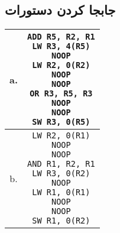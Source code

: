 \documentclass[11pt, dvipsnames, svgnames, x11names]{article}
\begin{document}
\subsection{جابجا کردن دستورات}
\begin{latin}
\begin{table}[H]
\begin{center}
\begin{tabular}{|c|c|}
\hline
a. &
\makecell[l]{
\texttt{ADD R5, R2, R1} \\
\texttt{LW R3, 4(R5)} \\
\texttt{NOOP} \\
\texttt{LW R2, 0(R2)} \\
\texttt{NOOP} \\
\texttt{NOOP} \\
\texttt{OR R3, R5, R3} \\
\texttt{NOOP} \\
\texttt{NOOP} \\
\texttt{SW R3, 0(R5)}
} \\
\hline
b. &
\makecell[l]{
\texttt{LW R2, 0(R1)} \\
\texttt{NOOP} \\
\texttt{NOOP} \\
\texttt{AND R1, R2, R1} \\
\texttt{LW R3, 0(R2)} \\
\texttt{NOOP} \\
\texttt{LW R1, 0(R1)} \\
\texttt{NOOP} \\
\texttt{NOOP} \\
\texttt{SW R1, 0(R2)}
} \\
\hline
\end{tabular}
\end{center}
\end{table}
\end{latin}
\end{document}
